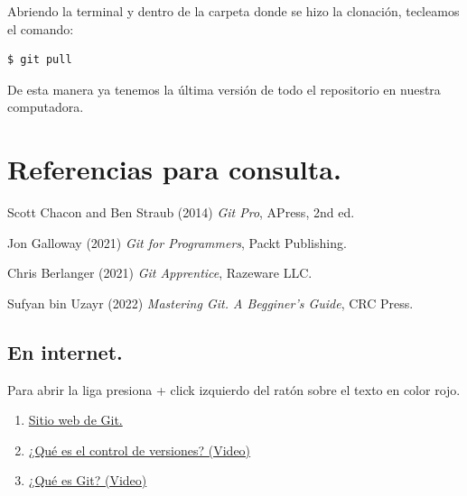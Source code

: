 Abriendo la terminal y dentro de la carpeta donde se hizo la clonación, tecleamos el comando:
\begin{verbatim}
$ git pull
\end{verbatim}
    
De esta manera ya tenemos la última versión de todo el repositorio en nuestra computadora.

\section{Referencias para consulta.}


\renewcommand{\refname}{Libros.}

\begin{thebibliography}{9}

Scott Chacon and Ben Straub (2014) \emph{Git Pro}, APress, 2nd ed.
    
Jon Galloway (2021) \emph{Git for Programmers}, Packt Publishing.

Chris Berlanger (2021) \emph{Git Apprentice}, Razeware LLC.

Sufyan bin Uzayr (2022) \emph{Mastering Git. A Begginer's Guide}, CRC Press.

\end{thebibliography}

\subsection*{\Large{En internet.}}

Para abrir la liga presiona \keys{\ctrl} + click izquierdo del ratón sobre el texto en color rojo.
\begin{enumerate}[label=\alph*)]
\item \href{https://git-scm.com/}{Sitio web de Git.}
\item \href{https://git-scm.com/video/what-is-version-control}{¿Qué es el control de versiones? (Video)}
\item \href{https://git-scm.com/video/what-is-git}{¿Qué es Git? (Video)}
 \end{enumerate}



